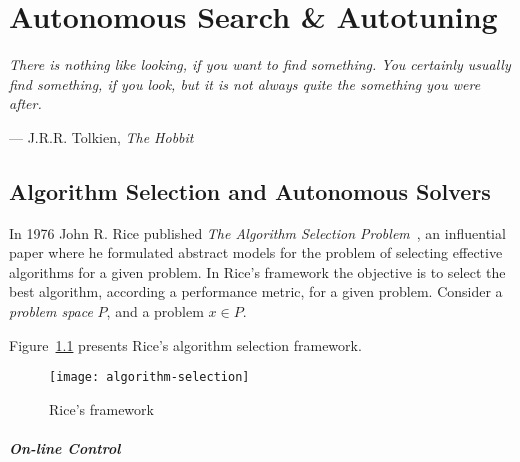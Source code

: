 \chapter{Autonomous Search \& Autotuning}
\label{chap:autonomous}
\epigraph{\textit{There is nothing like looking, if you want to find something. You
certainly usually find something, if you look, but it is not always quite the
something you were after.}}{--- J.R.R. Tolkien, \textit{The Hobbit}}


\section{Algorithm Selection and Autonomous Solvers}
\label{sec:algselres}

In 1976 John R. Rice published \textit{The Algorithm Selection
Problem}~\cite{rice1976algorithm}, an influential paper where he formulated
abstract models for the problem of selecting effective algorithms for a given
problem. In Rice's framework the objective is to select the best algorithm,
according a performance metric, for a given problem. Consider a \textit{problem
space} $P$, and a problem $x \in P$.

Figure~\ref{fig:riceframe} presents Rice's algorithm selection
framework.

\begin{figure}[htpb]
    \begin{center}
        \texttt{[image: algorithm-selection]}
    \end{center}
    \caption{Rice's framework}
    \label{fig:riceframe}
\end{figure}


\paragraph{On-line Control}
\label{sec:oncontrol}

%
%
%

